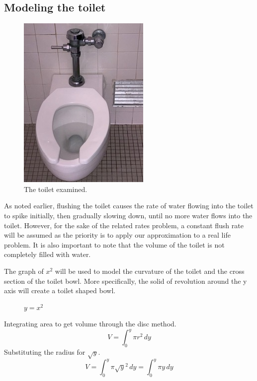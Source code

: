 \documentclass[12pt, titlepage]{article}
\begin{document}
\subsection{Modeling the toilet}
\begin{figure}[H]
\centering
  \includegraphics[angle=270]{toilet.jpeg}
    \caption{The toilet examined.}
\end{figure}

As noted earlier, flushing the toilet causes the rate of water flowing into the toilet to spike initially, then gradually slowing down, until no more water flows into the toilet. However, for the sake of the related rates problem, a constant flush rate will be assumed as the priority is to apply our approximation to a real life problem. It is also important to note that the volume of the toilet is not completely filled with water.  

The graph of \(x^{2}\) will be used to model the curvature of the toilet and the cross section of the toilet bowl. More specifically, the solid of revolution around the y axis will create a toilet shaped bowl. 

\begin{figure}[H]
\centering
    \caption[]{\(y=x^2\)}
\end{figure}

Integrating area to get volume through the disc method.
\begin{equation*}
    V = \int^y_0 \pi r^2\,dy
\end{equation*}
Substituting the radius for \(\sqrt{y}\).
\begin{equation*}
    V = \int^y_0 \pi \sqrt{y}^2\,dy  = \int^y_0 \pi y\,dy 
\end{equation*}
\end{document}
